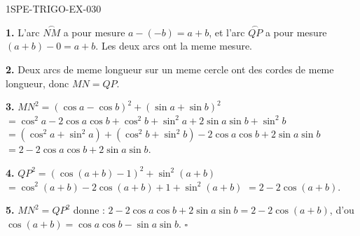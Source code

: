 \begin{corrige}{1SPE-TRIGO-EX-030}

\textbf{1.} L'arc $\overset{\frown}{NM}$ a pour mesure $a - (-b) = a + b$, et l'arc $\overset{\frown}{QP}$ a pour mesure $(a+b) - 0 = a+b$. Les deux arcs ont la meme mesure.

\textbf{2.} Deux arcs de meme longueur sur un meme cercle ont des cordes de meme longueur, donc $MN = QP$.

\textbf{3.} $MN^2 = (\cos a - \cos b)^2 + (\sin a + \sin b)^2$
$= \cos^2 a - 2\cos a\cos b + \cos^2 b + \sin^2 a + 2\sin a\sin b + \sin^2 b$
$= (\cos^2 a + \sin^2 a) + (\cos^2 b + \sin^2 b) - 2\cos a\cos b + 2\sin a\sin b$
$= 2 - 2\cos a\cos b + 2\sin a\sin b$.

\textbf{4.} $QP^2 = (\cos(a+b) - 1)^2 + \sin^2(a+b)$
$= \cos^2(a+b) - 2\cos(a+b) + 1 + \sin^2(a+b)$
$= 2 - 2\cos(a+b)$.

\textbf{5.} $MN^2 = QP^2$ donne :
$2 - 2\cos a\cos b + 2\sin a\sin b = 2 - 2\cos(a+b)$,
d'ou $\cos(a+b) = \cos a\cos b - \sin a\sin b$. \hfill $\square$

\end{corrige}
